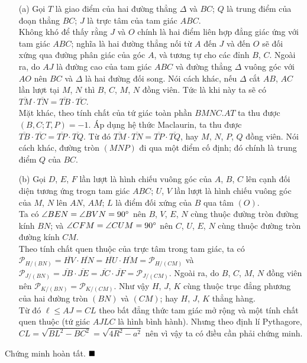 \documentclass{article} %
\newenvironment{solution}[1][Lời giải]{%
  \proof[\faPenNib \hspace{0.2cm} \ttfamily \scshape \large #1]%
}{\(\hfill \blacksquare\){\parfillskip0pt\par}}
\begin{document}
        \begin{solution}
            \hfill
            \begin{enumerate}
                \item[(a)] Gọi \(T\) là giao điểm của hai đường thẳng \(\Delta\) và \(BC\); \(Q\) là trung điểm của đoạn thẳng \(BC\); \(J\) là trực tâm của tam giác \(ABC\).\\
                Không khó để thấy rằng \(J\) và \(O\) chính là hai điểm liên hợp đẳng giác ứng với tam giác \(ABC\); nghĩa là hai đường thẳng nối từ \(A\) đến \(J\) và đến \(O\) sẽ đối xứng qua đường phân giác của góc \(A\), và tương tự cho các đỉnh \(B\), \(C\). Ngoài ra, do \(AJ\) là đường cao của tam giác \(ABC\) và đường thẳng \(\Delta\) vuông góc với \(AO\) nên \(BC\) và \(\Delta\) là hai đường đối song. Nói cách khác, nếu \(\Delta\) cắt \(AB\), \(AC\) lần lượt tại \(M\), \(N\) thì \(B\), \(C\), \(M\), \(N\) đồng viên. Tức là khi này ta sẽ có \(\overline{TM} \cdot \overline{TN} = \overline{TB} \cdot \overline{TC}\).\\
                Mặt khác, theo tính chất của tứ giác toàn phần \(BMNC.AT\) ta thu được \((B,C;T,P) = -1\). Áp dụng hệ thức Maclaurin, ta thu được \(\overline{TB} \cdot \overline{TC} = \overline{TP} \cdot \overline{TQ}\). Từ đó \(\overline{TM} \cdot \overline{TN} = \overline{TP} \cdot \overline{TQ}\), hay \(M\), \(N\), \(P\), \(Q\) đồng viên. Nói cách khác, đường tròn \((MNP)\) đi qua một điểm cố định; đó chính là trung điểm \(Q\) của \(BC\).
                \item[(b)] Gọi \(D\), \(E\), \(F\) lần lượt là hình chiếu vuông góc của \(A\), \(B\), \(C\) lên cạnh đối diện tương ứng trogn tam giác \(ABC\); \(U\), \(V\) lần lượt là hình chiếu vuông góc của \(M\), \(N\) lên \(AN\), \(AM\); \(L\) là điểm đối xứng của \(B\) qua tâm \((O)\).\\
                Ta có \(\angle BEN = \angle BVN = 90 \degree\) nên \(B\), \(V\), \(E\), \(N\) cùng thuộc đường tròn đường kính \(BN\); và \(\angle CFM = \angle CUM = 90 \degree\) nên \(C\), \(U\), \(E\), \(N\) cùng thuộc đường tròn đường kính \(CM\).\\
                Theo tính chất quen thuộc của trực tâm trong tam giác, ta có \(\mathcal{P}_{H/(BN)} = \overline{HV} \cdot \overline{HN} = \overline{HU} \cdot \overline{HM} = \mathcal{P}_{H/(CM)}\) và \(\mathcal{P}_{J/(BN)} = \overline{JB} \cdot \overline{JE} = \overline{JC} \cdot \overline{JF} = \mathcal{P}_{J/(CM)}\). Ngoài ra, do \(B\), \(C\), \(M\), \(N\) đồng viên nên \(\mathcal{P}_{K/(BN)} = \mathcal{P}_{K/(CM)}\). Như vậy \(H\), \(J\), \(K\) cùng thuộc trục đẳng phương của hai đường tròn \((BN)\) và \((CM)\); hay \(H\), \(J\), \(K\) thẳng hàng.\\
                Từ đó \(\ell \leq AJ = CL\) theo bất đẳng thức tam giác mở rộng và một tính chất quen thuộc (tứ giác \(AJLC\) là hình bình hành). Nhưng theo định lí Pythagore, \(CL = \sqrt{BL^2 - BC^2} = \sqrt{4R^2 - a^2}\) nên vì vậy ta có điều cần phải chứng minh.
            \end{enumerate}
            Chứng minh hoàn tất.
        \end{solution}
\end{document}

